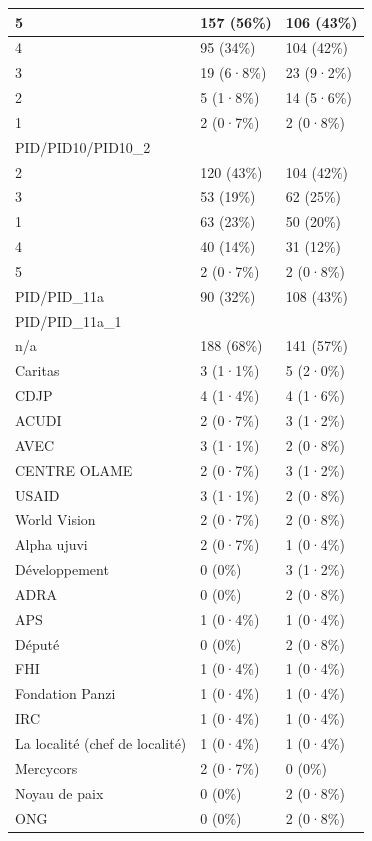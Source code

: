 \documentclass[
]{book}
\begin{document}
\begin{tabular}{l|l|l}
\hline
5 & 157 (56\%) & 106 (43\%)\\
\hline
4 & 95 (34\%) & 104 (42\%)\\
\hline
3 & 19 (6·8\%) & 23 (9·2\%)\\
\hline
2 & 5 (1·8\%) & 14 (5·6\%)\\
\hline
1 & 2 (0·7\%) & 2 (0·8\%)\\
\hline
PID/PID10/PID10\_2 &  & \\
\hline
2 & 120 (43\%) & 104 (42\%)\\
\hline
3 & 53 (19\%) & 62 (25\%)\\
\hline
1 & 63 (23\%) & 50 (20\%)\\
\hline
4 & 40 (14\%) & 31 (12\%)\\
\hline
5 & 2 (0·7\%) & 2 (0·8\%)\\
\hline
PID/PID\_11a & 90 (32\%) & 108 (43\%)\\
\hline
PID/PID\_11a\_1 &  & \\
\hline
n/a & 188 (68\%) & 141 (57\%)\\
\hline
Caritas & 3 (1·1\%) & 5 (2·0\%)\\
\hline
CDJP & 4 (1·4\%) & 4 (1·6\%)\\
\hline
ACUDI & 2 (0·7\%) & 3 (1·2\%)\\
\hline
AVEC & 3 (1·1\%) & 2 (0·8\%)\\
\hline
CENTRE OLAME & 2 (0·7\%) & 3 (1·2\%)\\
\hline
USAID & 3 (1·1\%) & 2 (0·8\%)\\
\hline
World Vision & 2 (0·7\%) & 2 (0·8\%)\\
\hline
Alpha ujuvi & 2 (0·7\%) & 1 (0·4\%)\\
\hline
Développement & 0 (0\%) & 3 (1·2\%)\\
\hline
ADRA & 0 (0\%) & 2 (0·8\%)\\
\hline
APS & 1 (0·4\%) & 1 (0·4\%)\\
\hline
Député & 0 (0\%) & 2 (0·8\%)\\
\hline
FHI & 1 (0·4\%) & 1 (0·4\%)\\
\hline
Fondation Panzi & 1 (0·4\%) & 1 (0·4\%)\\
\hline
IRC & 1 (0·4\%) & 1 (0·4\%)\\
\hline
La localité (chef de localité) & 1 (0·4\%) & 1 (0·4\%)\\
\hline
Mercycors & 2 (0·7\%) & 0 (0\%)\\
\hline
Noyau de paix & 0 (0\%) & 2 (0·8\%)\\
\hline
ONG & 0 (0\%) & 2 (0·8\%)\\

\end{tabular}
\end{document}
